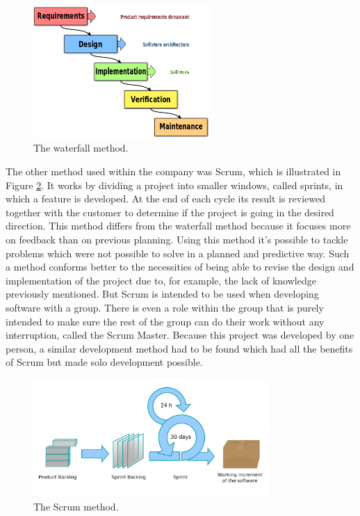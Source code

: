 \begin{figure}[ht]
    \centering
    \includegraphics[width=0.6\textwidth]{plaatjes/waterfall-method}
    \caption{The waterfall method.}
    \label{fig:waterfall-method}
\end{figure}%

The other method used within the company was Scrum, which is illustrated in Figure \ref{fig:scrum-method}. It works by dividing a project into smaller windows, called sprints, in which a feature is developed. At the end of each cycle its result is reviewed together with the customer to determine if the project is going in the desired direction. This method differs from the waterfall method because it focuses more on feedback than on previous planning. Using this method it's possible to tackle problems which were not possible to solve in a planned and predictive way. Such a method conforms better to the necessities of being able to revise the design and implementation of the project due to, for example, the lack of knowledge previously mentioned. But Scrum is intended to be used when developing software with a group. There is even a role within the group that is purely intended to make sure the rest of the group can do their work without any interruption, called the Scrum Master. Because this project was developed by one person, a similar development method had to be found which had all the benefits of Scrum but made solo development possible.

\begin{figure}[ht]
    \centering
    \includegraphics[width=0.8\textwidth]{plaatjes/scrum-method}
    \caption{The Scrum method.}
    \label{fig:scrum-method}
\end{figure}%


